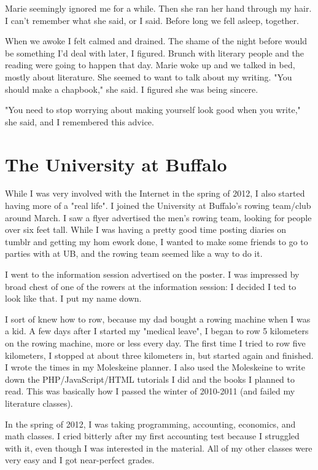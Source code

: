 \documentclass[12pt]{article}
\begin{document}
Marie seemingly ignored me for a while. Then she ran her hand through my hair.
I can't remember what she said, or I said.  Before long we fell asleep,
together.

When we awoke I felt calmed and drained.  The shame of the night before would be
something I'd deal with later, I figured.  Brunch with literary people and the
reading were going to happen that day.  Marie woke up and we talked in bed,
mostly about literature.  She seemed to want to talk about my writing.  "You
should make a chapbook," she said.  I figured she was being sincere.  

"You need to stop worrying about making yourself look good when you write," she
said, and I remembered this advice.

\section{The University at Buffalo}
While I was very involved with the Internet in the spring of 2012, I also
started having more of a "real life".  I joined the University at Buffalo's
rowing team/club around March.  I saw a flyer advertised the men's rowing team,
looking for people over six feet tall.  While I was having a pretty good time
posting diaries on tumblr and getting my hom ework done, I wanted to make some
friends to go to parties with at UB, and the  rowing team seemed like a way to do
it.  

I went to the information session advertised on the poster.  I was impressed by
 broad chest of one of the rowers at the information session: I decided I
ted to look like that.  I put my name down.

I sort of knew how to row, because my dad bought a rowing machine when I was a
kid.  A few days after I started my "medical leave", I began to row 5 kilometers
on the rowing machine, more or less every day.  The first time I tried to row
five kilometers, I stopped at about three kilometers in, but started again and
finished.  I wrote the times in my Moleskeine planner.  I also used the
Moleskeine to write down the PHP/JavaScript/HTML tutorials I did and the books I
planned to read.  This was basically how I passed the winter of 2010-2011 (and
failed my literature classes).

In the spring of 2012, I was taking programming, accounting, economics, and math
classes.  I cried bitterly after my first accounting test because I struggled
with it, even though I was interested in the material.  All of my other classes
were very easy and I got near-perfect grades.
\end{document}
